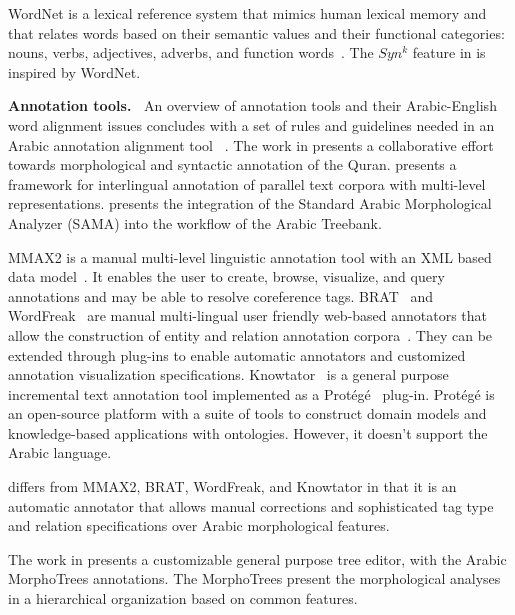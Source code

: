 WordNet is a lexical reference system that mimics human lexical memory 
and that relates words based on their semantic values and their functional 
categories: nouns, verbs, adjectives, adverbs, and function words~\cite{intro}. 
The $Syn^k$ feature in \framework is inspired by WordNet.

{\bf Annotation tools.~}
An overview of annotation tools and their Arabic-English word alignment issues 
concludes with a set of rules and guidelines needed in an Arabic annotation alignment tool
~\cite{kholidy2010towards}. 
The work in \cite{dukes2011supervised} presents a collaborative effort towards morphological 
and syntactic annotation of the Quran. 
\cite{dorr2010interlingual} presents a framework for interlingual 
annotation of parallel text corpora with multi-level representations. 
\cite{kulick2010consistent} presents the integration of the 
Standard Arabic Morphological Analyzer (SAMA) into the workflow of the Arabic Treebank.

MMAX2 is a manual multi-level linguistic annotation tool with an XML 
based data model~\cite{mmax2}. 
It enables the user to create, browse, visualize, and query annotations
and may be able to resolve coreference tags. 
BRAT~\cite{brat} and WordFreak~\cite{wordfreak} are manual 
multi-lingual user friendly web-based annotators that allow the construction 
of entity and relation annotation corpora~\cite{brat}. 
They can be extended through plug-ins to enable automatic annotators 
and customized annotation visualization specifications.
Knowtator~\cite{ogren2006knowtator} is a general purpose incremental text annotation tool 
implemented as a Prot\'eg\'e~\cite{gennari2003evolution} plug-in. 
Prot\'eg\'e is an open-source platform with a suite of tools to construct domain 
models and knowledge-based applications with ontologies. 
However, it doesn't support the Arabic language.

\framework differs from MMAX2, BRAT, WordFreak, and Knowtator in that it is 
an automatic annotator that allows manual corrections 
and sophisticated tag type and relation specifications over
Arabic morphological features.

The work in \cite{smrz2004morphotrees} presents %
a customizable general purpose tree editor, with the Arabic MorphoTrees annotations. 
The MorphoTrees present the morphological analyses in a hierarchical organization 
based on common features. 

